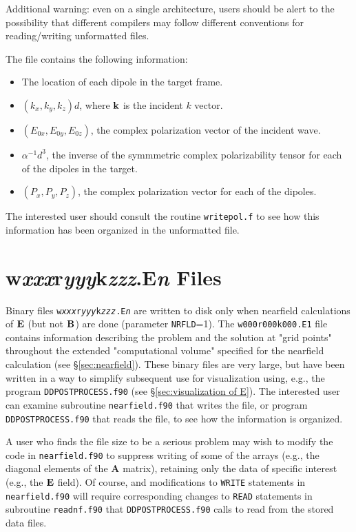 \begin{appendix}
Additional warning: even on a single architecture, users should be alert to the
possibility that different compilers may follow
different conventions for reading/writing unformatted files.
  
The file contains the following information:
\begin{itemize}
\item The location of each dipole in the target frame.
\item $(k_x,k_y,k_z)d$, where $\bf k$ is the incident $k$ vector.
\item $(E_{0x},E_{0y},E_{0z})$, the complex polarization vector of the
incident wave.
\item $\alpha^{-1}d^3$, the inverse of the symmmetric complex
      polarizability tensor for each of the dipoles in the target.
\item $(P_x,P_y,P_z)$, the complex polarization vector for each of the
      dipoles.
\end{itemize}
The interested user should consult the routine {\tt writepol.f} to
see how this information has been organized in the unformatted file.

\section{{w{\it xxx}r{\it yyy}k{\it zzz}.E{\it n}} Files
         \label{app:w000r000k000.En}}

Binary files {\tt w{\it xxx}r{\it yyy}k{\it zzz}.E{\it n}} are written to disk
only when nearfield calculations of ${\bf E}$ (but not ${\bf B}$) 
are done (parameter {\tt NRFLD}=1).
The {\tt w000r000k000.E1} file contains information describing the problem and
the solution at "grid points" throughout the extended "computational volume" specified
for the nearfield calculation (see \S\ref{sec:nearfield}).
These binary files are very large, but have been written in a way to simplify
subsequent use for visualization using, e.g., 
the program {\tt DDPOSTPROCESS.f90}
(see \S\ref{sec:visualization of E}).
The interested user can examine subroutine {\tt nearfield.f90} that writes
the file, or
program {\tt DDPOSTPROCESS.f90} that reads the file, to see how the
information is organized.

A user who finds the file size to be a serious problem may wish to modify the
code in {\tt nearfield.f90} to suppress writing of some of the arrays
(e.g., the diagonal elements of the {\bf A} matrix), retaining only
the data of specific interest (e.g., the ${\bf E}$ field).  Of course,
and modifications to {\tt WRITE} statements in {\tt nearfield.f90} will require corresponding
changes to {\tt READ} statements in subroutine {\tt readnf.f90} that 
{\tt DDPOSTPROCESS.f90} calls to read from the stored data files.


\end{appendix}
